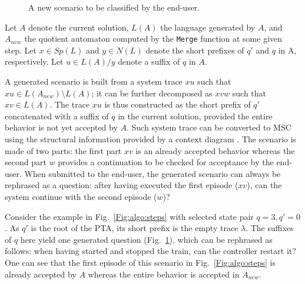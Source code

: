 \begin{description}
\begin{figure}
\centering
{}
\caption{A new scenario to be classified by the end-user\label{Fig:generated:question}.}
\end{figure}

Let $A$ denote the current solution, $L(A)$ the language generated by $A$, and $A_{new}$ the quotient automaton computed by the \texttt{Merge} function at some given step. Let $x \in Sp(L)$ and $y \in N(L)$ denote the short prefixes of $q'$ and $q$ in A, respectively. Let $u \in L(A)/y$ denote a suffix of $q$ in $A$. 

A generated scenario is built from a system trace $xu$ such that $xu \in L(A_{new})\setminus L(A)$; it can be further decomposed as $xvw$ such that $xv \in L(A)$. The trace $xu$ is thus constructed as the short prefix of $q'$ concatenated with a suffix of $q$ in the current solution, provided the entire behavior is not yet accepted by $A$. Such system trace can be converted to MSC using the structural information provided by a context diagram \cite{Jackson:1995}. The scenario is made of two parts: the first part $xv$ is an already accepted behavior whereas the second part $w$ provides a continuation to be checked for acceptance by the end-user. When submitted to the end-user, the generated scenario can always be rephrased as a question: after having executed the first episode ($xv$), can the system continue with the second episode ($w$)? 

Consider the example in Fig.~\ref{Fig:algo:steps} with selected state pair $q=3, q'=0$. As $q'$ is the root of the PTA, its short prefix is the empty trace $\lambda$. The suffixes of $q$ here yield one generated question (Fig.~\ref{Fig:generated:question}), which can be rephrased as follows: when having started and stopped the train, can the controller restart it? One can see that the first episode of this scenario in Fig.~\ref{Fig:algo:steps} is already accepted by $A$ whereas the entire behavior is accepted in $A_{new}$.


\end{description}
